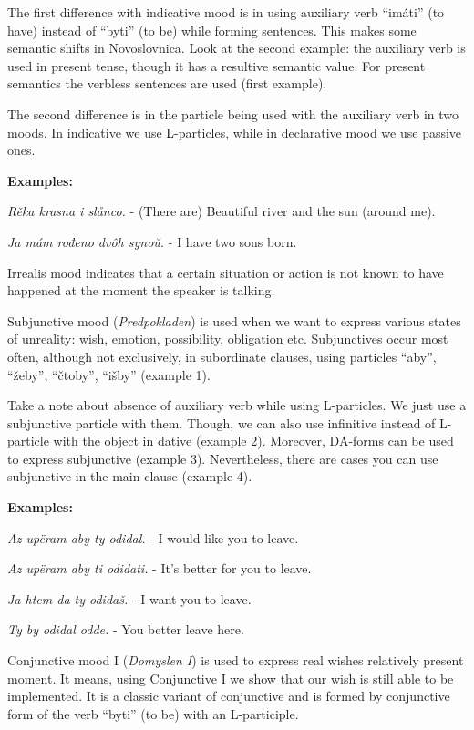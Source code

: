The first difference with indicative mood is in using auxiliary verb “imáti” (to have) instead of “byti” (to be) while forming sentences. This makes some semantic shifts in Novoslovnica. Look at the second example: the auxiliary verb is used in present tense, though it has a resultive semantic value. For present semantics the verbless sentences are used (first example).

The second difference is in the particle being used with the auxiliary verb in two moods. In indicative we use L-particles, while in declarative mood we use passive ones.

\textbf{Examples:}

\textit{Rěka krasna i slånco.} - (There are) Beautiful river and the sun (around me).

\textit{Ja mám rođeno dvôh synoŭ.} - I have two sons born.

Irrealis mood indicates that a certain situation or action is not known to have happened at the moment the speaker is talking. 

Subjunctive mood (\textit{Predpokladen}) is used when we want to express various states of unreality: wish, emotion, possibility, obligation etc. Subjunctives occur most often, although not exclusively, in subordinate clauses, using particles “aby”, “žeby”, “čtoby”, “išby” (example 1).

Take a note about absence of auxiliary verb while using L-particles. We just use a subjunctive particle with them. Though, we can also use infinitive instead of L-particle with the object in dative (example 2). Moreover, DA-forms can be used to express subjunctive (example 3). Nevertheless, there are cases you can use subjunctive in the main clause (example 4). 

\textbf{Examples:}

\textit{Az upëram aby ty odidal.} - I would like you to leave.

\textit{Az upëram aby ti odidati.} - It’s better for you to leave.

\textit{Ja htem da ty odidaš.} - I want you to leave.

\textit{Ty by odidal odde.} - You better leave here.

Conjunctive mood I (\textit{Domyslen I}) is used to express real wishes relatively present moment. It means, using Conjunctive I we show that our wish is still able to be implemented. It is a classic variant of conjunctive and is formed by conjunctive form of the verb “byti” (to be) with an L-participle.

